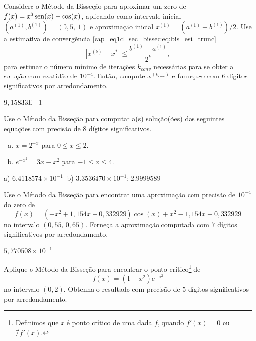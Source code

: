 \begin{exer}
  Considere o Método da Bisseção para aproximar um zero de $f(x)=x^3\operatorname{sen}(x)-\cos(x)$, aplicando como intervalo inicial $(a^{(1)}, b^{(1)}) = (0,5, ~1)$ e aproximação inicial $x^{(1)}=(a^{(1)}+b^{(1)})/2$. Use a estimativa de convergência \eqref{cap_eq1d_sec_bissec:eq:bis_est_trunc}
  \begin{equation}
    \left|x^{(k)} - x^{*}\right| \leq \frac{b^{(1)}-a^{(1)}}{2^k},
  \end{equation}
para estimar o número mínimo de iterações $k_{conv}$ necessárias para se obter a solução com exatidão de $10^{-4}$. Então, compute $x^{(k_{conv})}$ e forneça-o com $6$ dígitos significativos por arredondamento.
\end{exer}
\begin{resp}
  $9,15833\mathrm{E}\!-\!1$
\end{resp}

\begin{exer}
  Use o Método da Bisseção para computar a(s) solução(ões) das seguintes equações com precisão de 8 dígitos significativos.
  \begin{enumerate}[a)]
  \item $x = 2^{-x}$ para $0\leq x \leq 2$.
  \item $e^{-x^2} = 3x - x^2$ para $-1\leq x\leq 4$.
  \end{enumerate}
\end{exer}
\begin{resp}
  a) $6.4118574\times 10^{-1}$; b) $3.3536470\times 10^{-1}$; $2.9999589$
\end{resp}

\begin{exer}
  Use o Método da Bisseção para encontrar uma aproximação com precisão de $10^{-4}$ do zero de
  \begin{equation}
    f(x) = (-x^2+1,154x-0,332929)\cos(x) + x^2 - 1,154x + 0,332929
  \end{equation}
no intervalo $(0,55, ~0,65)$. Forneça a aproximação computada com $7$ dígitos significativos por arredondamento.
\end{exer}
\begin{resp}
  $5,770508\times 10^{-1}$
\end{resp}

\begin{exer}
  Aplique o Método da Bisseção para encontrar o ponto crítico\footnote{Definimos que $x$ é ponto crítico de uma dada $f$, quando $f'(x) = 0$ ou $\nexists f'(x)$.} de
  \begin{equation}
    f(x) = (1-x^2)e^{-x^2}
  \end{equation}
  no intervalo $(0, 2)$. Obtenha o resultado com precisão de $5$ dígitos significativos por arredondamento.
\end{exer}

